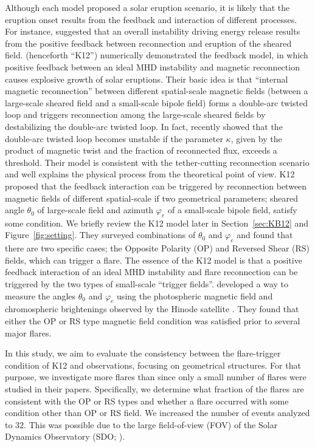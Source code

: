 \documentclass[10pt,preprint2]{aastex}
\begin{document}
Although each model proposed a solar eruption scenario, it is likely that the eruption onset results from the feedback and interaction of different processes.
For instance, \citet{hagyard84a} suggested that an overall instability driving energy release results from the positive feedback between reconnection and eruption of the sheared field.
\citet{kusano12} (henceforth ``K12'') numerically demonstrated the feedback model, in which positive feedback between an ideal MHD instability and magnetic reconnection causes explosive growth of solar eruptions.
Their basic idea is that ``internal magnetic reconnection'' between different spatial-scale magnetic fields (between a large-scale sheared field and a small-scale bipole field) forms a double-arc twisted loop and triggers reconnection among the large-scale sheared fields by destabilizing the double-arc twisted loop.
In fact, \citet{ishiguro17} recently showed that the double-arc twisted loop becomes unstable if the parameter $\kappa$, given by the product of magnetic twist and the fraction of reconnected flux, exceeds a threshold.
Their model is consistent with the tether-cutting reconnection scenario and well explains the physical process from the theoretical point of view.
K12 proposed that the feedback interaction can be triggered by reconnection between magnetic fields of different spatial-scale if two geometrical parameters; sheared angle $\theta_{0}$ of large-scale field and azimuth $\varphi_{e}$ of a small-scale bipole field, satisfy some condition.
We briefly review the K12 model later in Section~\ref{sec:KB12} and Figure~\ref{fig:setting}.
They surveyed combinations of $\theta_{0}$ and $\varphi_{e}$ and found that there are two specific cases; the Opposite Polarity (OP) and Reversed Shear (RS) fields, which can trigger a flare.
The essence of the K12 model is that a positive feedback interaction of an ideal MHD instability and flare reconnection can be triggered by the two types of small-scale ``trigger fields''.
\citet{bamba13} developed a way to measure the angles $\theta_{0}$ and $\varphi_{e}$ using the photospheric magnetic field and chromospheric brightenings observed by the Hinode satellite \citep{kosugi07}.
They found that either the OP or RS type magnetic field condition was satisfied prior to several major flares.

In this study,  we aim to evaluate the consistency between the flare-trigger condition of K12 and observations, focusing on geometrical structures.
For that purpose, we investigate more flares than \citet{bamba13} since only a small number of flares were studied in their papers.
Specifically, we determine what fraction of the flares are consistent with the OP or RS types and whether a flare occurred with some condition other than OP or RS field.
We increased the number of events analyzed to 32.
This was possible due to the large field-of-view (FOV) of the Solar Dynamics Observatory (SDO; \citet{pesnell12}).
\end{document}

